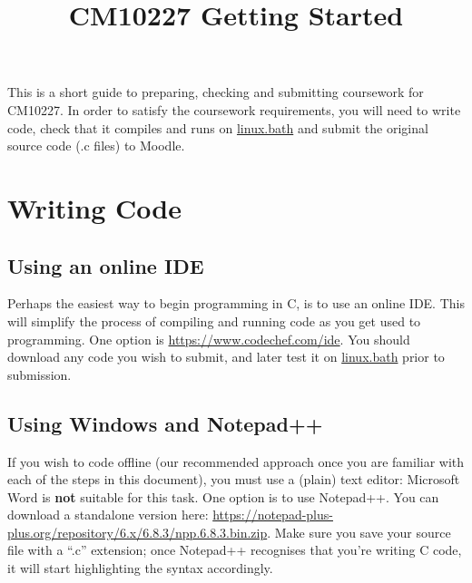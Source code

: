 \documentclass[12pt, a4paper, oneside]{article}
\author{}
\date{}
\title{CM10227 Getting Started}
\begin{document}
\maketitle

This is a short guide to preparing, checking and submitting coursework for CM10227.
In order to satisfy the coursework requirements, you will need to write code, check that it compiles and runs on \href{http://www.bath.ac.uk/guides/connecting-to-linux-bath/}{linux.bath} and submit the original source code (.c files) to Moodle.

\section{Writing Code}

\subsection{Using an online IDE}
Perhaps the easiest way to begin programming in C, is to use an online IDE.
This will simplify the process of compiling and running code as you get used to programming.
One option is \url{https://www.codechef.com/ide}.
You should download any code you wish to submit, and later test it on \href{http://www.bath.ac.uk/guides/connecting-to-linux-bath/}{linux.bath} prior to submission.

 \subsection{Using Windows and Notepad++}
 If you wish to code offline (our recommended approach once you are familiar with each of the steps in this document), you must use a (plain) text editor: Microsoft Word is \textbf{not} suitable for this task.
 One option is to use Notepad++.
 You can download a standalone version here: \url{https://notepad-plus-plus.org/repository/6.x/6.8.3/npp.6.8.3.bin.zip}.
 Make sure you save your source file with a ``.c'' extension; once Notepad++ recognises that you're writing C code, it will start highlighting the syntax accordingly.
\end{document}
